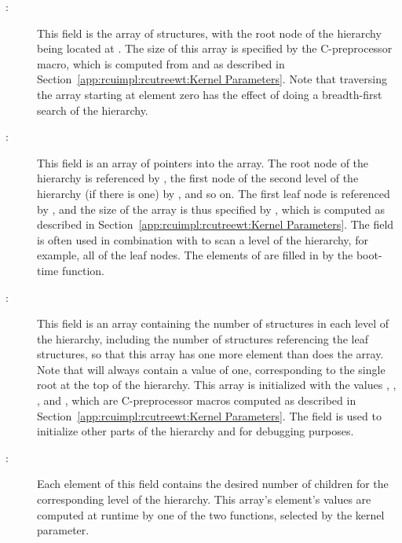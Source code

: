 \begin{description}
\item[:]
	This field is the array of  structures,
	with the root node of the hierarchy being located at
	.
	The size of this array is specified by the
	 C-preprocessor macro, which is computed
	from  and 
	as described in
	Section~\ref{app:rcuimpl:rcutreewt:Kernel Parameters}.
	Note that traversing the  array starting at
	element zero has the effect of doing a breadth-first search
	of the  hierarchy.
\item[:]
	This field is an array of pointers into the  array.
	The root node of the hierarchy is referenced by
	, the first node of the second level of
	the hierarchy (if there is one) by , and so on.
	The first leaf node is referenced by
	, and the size of the 
	array is thus specified by , which is
	computed as described in
	Section~\ref{app:rcuimpl:rcutreewt:Kernel Parameters}.
	The  field is often used in combination with
	 to scan a level of the  hierarchy,
	for example, all of the leaf nodes.
	The elements of  are filled in by the
	boot-time  function.
\item[:]
	This field is an array containing the number of 
	structures in each level of the hierarchy, including the
	number of  structures referencing the leaf
	 structures, so that this array has one more
	element than does the  array.
	Note that  will always contain a value of
	one, corresponding to the single root  at the
	top of the hierarchy.
	This array is initialized with the values
	,
	,
	, and
	,
	which are C-preprocessor macros computed as described in
	Section~\ref{app:rcuimpl:rcutreewt:Kernel Parameters}.
	The  field is used to initialize
	other parts of the hierarchy and for debugging purposes.
\item[:]
	Each element of this field contains the desired number of children
	for the corresponding level of the  hierarchy.
	This array's element's values are computed at runtime
	by one of the two  functions,
	selected by the  kernel parameter.

\end{description}
